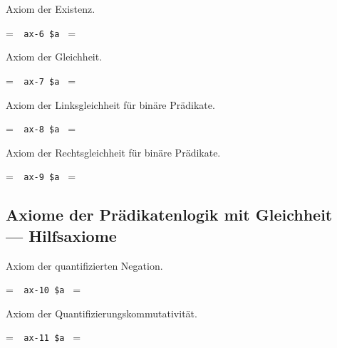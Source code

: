 \noindent Axiom der Existenz.

\setbox\startprefix=\hbox{\tt \ \ ax-6\ \$a\ }
\setbox\contprefix=\hbox{\tt \ \ \ \ \ \ \ \ \ \ }
\startm
\m{\vdash}\m{(}\m{\forall}\m{(}\m{=}\m{\rightarrow}\m{\forall}
\m{\varphi}\m{)}\m{\rightarrow}\m{\varphi}\m{)}
\endm

\noindent Axiom der Gleichheit.

\setbox\startprefix=\hbox{\tt \ \ ax-7\ \$a\ }
\setbox\contprefix=\hbox{\tt \ \ \ \ \ \ \ \ \ \ }
\startm
\m{\vdash}\m{(}\m{=}\m{\rightarrow}\m{(}\m{=}\m{
\rightarrow}\m{=}\m{)}\m{)}
\endm

\noindent Axiom der Linksgleichheit für binäre Prädikate.

\setbox\startprefix=\hbox{\tt \ \ ax-8\ \$a\ }
\setbox\contprefix=\hbox{\tt \ \ \ \ \ \ \ \ \ \ \ }
\startm
\m{\vdash}\m{(}\m{=}\m{\rightarrow}\m{(}\m{\in}\m{
\rightarrow}\m{\in}\m{)}\m{)}
\endm

\noindent Axiom der Rechtsgleichheit für binäre Prädikate.

\setbox\startprefix=\hbox{\tt \ \ ax-9\ \$a\ }
\setbox\contprefix=\hbox{\tt \ \ \ \ \ \ \ \ \ \ \ }
\startm
\m{\vdash}\m{(}\m{=}\m{\rightarrow}\m{(}\m{\in}\m{
\rightarrow}\m{\in}\m{)}\m{)}
\endm


\subsection{Axiome der Prädikatenlogik mit Gleichheit\texorpdfstring{\\---}{ ---} Hilfsaxiome}

\noindent Axiom der quantifizierten Negation.

\setbox\startprefix=\hbox{\tt \ \ ax-10\ \$a\ }
\setbox\contprefix=\hbox{\tt \ \ \ \ \ \ \ \ \ \ }
\startm
\m{\vdash}\m{(}\m{\lnot}\m{\forall}\m{\lnot}\m{\forall}\m{\varphi}\m{
\rightarrow}\m{\varphi}\m{)}
\endm

\noindent Axiom der Quantifizierungskommutativität.

\setbox\startprefix=\hbox{\tt \ \ ax-11\ \$a\ }
\setbox\contprefix=\hbox{\tt \ \ \ \ \ \ \ \ \ \ }
\startm
\m{\vdash}\m{(}\m{\forall}\m{\forall}\m{\varphi}\m{\rightarrow}\m{
\forall}\m{\forall}\m{\varphi}\m{)}
\endm

